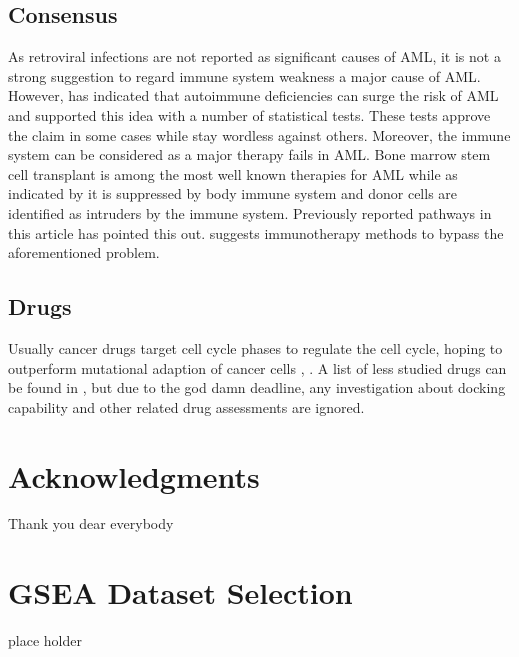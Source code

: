 \documentclass[3p,authoryear,preprint,12pt]{elsarticle}
\begin{document}
\subsection{Consensus}
As retroviral infections are not reported as significant causes of AML, it is not a strong suggestion to regard immune system weakness a major cause of AML. However, %
has indicated that autoimmune deficiencies can surge the risk of AML and supported this idea with a number of statistical tests. These tests approve the claim in some cases while stay wordless against others. Moreover, the immune system can be considered as a major therapy fails in AML. Bone marrow stem cell transplant is among the most well known therapies for AML while as indicated by %
it is suppressed by body immune system and donor cells are identified as intruders by the immune system. Previously reported pathways in this article has pointed this out. %
suggests immunotherapy methods to bypass the aforementioned problem.

\subsection{Drugs}
Usually cancer drugs target cell cycle phases to regulate the cell cycle, hoping to outperform mutational adaption of cancer cells %
, %
. A list of less studied drugs can be found in %
, but due to the god damn deadline, any investigation about docking capability and other related drug assessments are ignored.

\section*{Acknowledgments} Thank you dear everybody
\appendix

\section{GSEA Dataset Selection}\label{appendix-title-1f696b9ef905}
    place holder
\end{document}
